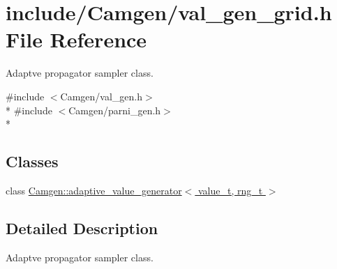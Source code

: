 \hypertarget{a00830}{}\section{include/\+Camgen/val\+\_\+gen\+\_\+grid.h File Reference}
\label{a00830}


Adaptve propagator sampler class.  


{\ttfamily \#include $<$Camgen/val\+\_\+gen.\+h$>$}\\*
{\ttfamily \#include $<$Camgen/parni\+\_\+gen.\+h$>$}\\*
\subsection*{Classes}
\begin{DoxyCompactItemize}
\item 
class \hyperlink{a00001}{Camgen\+::adaptive\+\_\+value\+\_\+generator$<$ value\+\_\+t, rng\+\_\+t $>$}
\end{DoxyCompactItemize}


\subsection{Detailed Description}
Adaptve propagator sampler class. 

